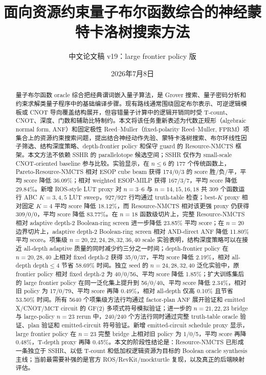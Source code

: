 \documentclass[UTF8,fontset=macnew,11pt]{ctexart}
\title{面向资源约束量子布尔函数综合的神经蒙特卡洛树搜索方法}
\author{中文论文稿 v19：large frontier policy 版}
\date{2026年7月8日}
\newcommand{\method}{Resource-NMCTS}
\newcommand{\screen}{Boolean-ring screen}
\newcommand{\anf}{\ensuremath{\mathrm{ANF}}}
\newcommand{\fprm}{\ensuremath{\mathrm{FPRM}}}
\newcommand{\ttable}{truth-table}
\newcommand{\mct}{\ensuremath{\mathrm{MCT}}}
\begin{document}
\pagestyle{plain}
\maketitle

\begin{abstract}
量子布尔函数 oracle 综合把经典谓词嵌入量子算法，是 Grover 搜索、量子密码分析和约束求解类量子程序中的基础编译步骤。现有路线通常围绕固定布尔表示、可逆逻辑模板或 CNOT 导向覆盖结构展开，但容错量子计算中的逻辑开销同时受 T-count、CNOT、深度、门数和辅助比特制约。本文将该任务重新表述为代数正规形（algebraic normal form, \anf{}）和固定极性 Reed--Muller（fixed-polarity Reed--Muller, \fprm{}）项集合上的资源约束搜索问题，提出结合神经动作先验、蒙特卡洛树搜索、布尔环线性因子筛选、结构深度策略、depth-frontier policy 和保守 guard 的 \method{} 框架。本文方法不依赖 SSHR 的 parallelotope 候选空间；SSHR 仅作为 small-scale CNOT-oriented baseline 参与比较。实验显示，在 $n\leq6$ 的 177 个传统函数上，Pareto-\method{} 相对 ESOP cube beam 获得 174/0/3 的 score 胜/负/平，平均 score 降低 36.09\%；相对 weighted ESOP-MILP 获得 167/3/7，平均 score 降低 29.84\%。新增 ROS-style LUT proxy 对 $n=3$--$6$ 与 $n=14,15,16,18$ 共 309 个函数运行 ABC $K=3,4,5$ LUT sweep，927/927 行均通过 truth-table 检查；best-$K$ proxy 相对固定 $K=4$ 平均 score 降低 18.12\%，而 \method{} 相对该更强 proxy 仍获得 309/0/0，平均 score 降低 83.77\%。在 $n=18$ 函数级切片上，完整 \method{} 相对 adaptive depth-2 \screen{} 进一步降低 23.85\% 平均 score；在 $n=20$ 边界切片上，adaptive depth-2 \screen{} 相对 AND-direct ANF 降低 11.80\% 平均 score。项集级 $n=20,22,24,28,32,36,40$ scale 实验表明，结构深度策略可以在接近 all-depth adaptive 质量的同时减少约三分之一时间；depth-frontier policy 在 $n=20,28,40$ 上相对 fixed depth-2 获得 35/0/37，平均 score 降低 2.19\%，相对 all-depth depth$\leq4$ 节省 58.69\% 时间。独立 seed 的 $n=24,28,32,40$ 泛化实验中，原 frontier policy 相对 fixed depth-2 为 40/0/56、平均 score 降低 1.85\%；扩大训练集后的 large frontier policy 在同一泛化集上提升到 56/0/40、平均 score 降低 2.34\%，相对旧 policy 为 17/0/79、平均 score 再降 0.49\%，相对 all-depth 仅高 0.10\% 且节省 53.50\% 时间。所有 5640 个项集级方法行均通过 factor-plan \anf{} 展开验证和 emitted X/CNOT/\mct{} circuit 的 GF(2) 多项式符号模拟验证；进一步的 $n=21,22,23$ bridge 与 large-policy $n=23$ rerun 中，240/240 个方法行同时通过完整 \ttable{} oracle 验证、plan 验证和 emitted-circuit 符号验证。新增 emitted-circuit schedule proxy 显示，large frontier policy 在 $n=23$ 完整 bridge 上相对旧 policy 为 1/0/5，平均 score 再降 0.48\%，T-depth proxy 再降 0.45\%。本文的阶段性结论是：\method{} 已形成一条独立于 SSHR、以低 T-count 和低加权逻辑资源为目标的 Boolean oracle synthesis 主线；当前最需要补强的是官方 ROS/RevKit/mockturtle 复现，以及真正的后端映射评估。
\end{abstract}
\end{document}
